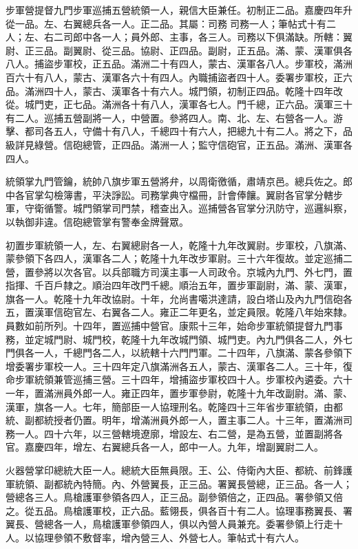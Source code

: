 \begin{pinyinscope}
步軍營提督九門步軍巡捕五營統領一人，親信大臣兼任。初制正二品。嘉慶四年升從一品。左、右翼總兵各一人。正二品。其屬：司務司務一人；筆帖式十有二人；左、右二司郎中各一人；員外郎、主事，各三人。司務以下俱滿缺。所轄：翼尉、正三品。副翼尉、從三品。協尉、正四品。副尉，正五品。滿、蒙、漢軍俱各八人。捕盜步軍校，正五品。滿洲二十有四人，蒙古、漢軍各八人。步軍校，滿洲百六十有八人，蒙古、漢軍各六十有四人。內職捕盜者四十人。委署步軍校，正六品。滿洲四十人，蒙古、漢軍各十有六人。城門領，初制正四品。乾隆十四年改從。城門吏，正七品。滿洲各十有八人，漢軍各七人。門千總，正六品。漢軍三十有二人。巡捕五營副將一人，中營置。參將四人。南、北、左、右營各一人。游擊、都司各五人，守備十有八人，千總四十有六人，把總九十有二人。將之下，品級詳見綠營。信砲總管，正四品。滿洲一人；監守信砲官，正五品。滿洲、漢軍各四人。

統領掌九門管鑰，統帥八旗步軍五營將弁，以周衛徼循，肅靖京邑。總兵佐之。郎中各官掌勾檢簿書，平決諍訟。司務掌典守檔冊，計會俸饟。翼尉各官掌分轄步軍，守衛循警。城門領掌司門禁，稽查出入。巡捕營各官掌分汛防守，巡邏糾察，以執御非違。信砲總管掌有警奉金牌聲眾。

初置步軍統領一人，左、右翼總尉各一人，乾隆十九年改翼尉。步軍校，八旗滿、蒙參領下各四人，漢軍各二人；乾隆十九年改步軍尉。三十六年復故。並定巡捕二營，置參將以次各官。以兵部職方司漢主事一人司政令。京城內九門、外七門，置指揮、千百戶隸之。順治四年改門千總。順治五年，置步軍副尉，滿、蒙、漢軍，旗各一人。乾隆十九年改協尉。十年，允尚書噶洪達請，設白塔山及內九門信砲各五，置漢軍信砲官左、右翼各二人。雍正二年更名，並定員限。乾隆八年始來隸。員數如前所列。十四年，置巡捕中營官。康熙十三年，始命步軍統領提督九門事務，並定城門尉、城門校，乾隆十九年改城門領、城門吏。內九門俱各二人，外七門俱各一人，千總門各二人，以統轄十六門門軍。二十四年，八旗滿、蒙各參領下增委署步軍校一人。三十四年定八旗滿洲各五人，蒙古、漢軍各二人。三十年，復命步軍統領兼管巡捕三營。三十四年，增捕盜步軍校四十人。步軍校內遴委。六十一年，置滿洲員外郎一人。雍正四年，置步軍參尉，乾隆十九年改副尉。滿、蒙、漢軍，旗各一人。七年，簡部臣一人協理刑名。乾隆四十三年省步軍統領，由都統、副都統授者仍置。明年，增滿洲員外郎一人，置主事二人。十三年，置滿洲司務一人。四十六年，以三營轄境遼廓，增設左、右二營，是為五營，並置副將各官。嘉慶四年，增左、右翼總兵各一人，郎中一人。九年，增副翼尉二人。

火器營掌印總統大臣一人。總統大臣無員限。王、公、侍衛內大臣、都統、前鋒護軍統領、副都統內特簡。內、外營翼長，正三品。署翼長營總，正三品。各一人；營總各三人。鳥槍護軍參領各四人，正三品。副參領倍之，正四品。署參領又倍之。從五品。鳥槍護軍校，正六品。藍翎長，俱各百十有二人。協理事務翼長、署翼長、營總各一人，鳥槍護軍參領四人，俱以內營人員兼充。委署參領上行走十人。以協理參領不敷督率，增內營三人、外營七人。筆帖式十有六人。


\end{pinyinscope}
